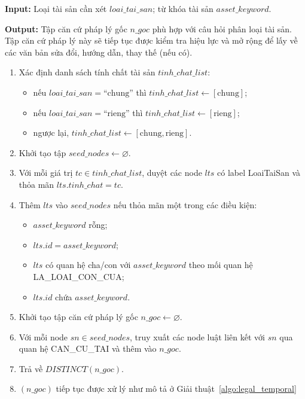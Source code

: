 \documentclass[../DoAn.tex]{subfiles}
\begin{document}
\begin{algorithm}[H]
\footnotesize
\textbf{Input:} Loại tài sản cần xét $loai\_tai\_san$; từ khóa tài sản $asset\_keyword$.

\textbf{Output:} Tập căn cứ pháp lý gốc $n\_goc$ phù hợp với câu hỏi phân loại tài sản. Tập căn cứ pháp lý này sẽ tiếp tục được kiểm tra hiệu lực và mở rộng để lấy về các văn bản sửa đổi, hướng dẫn, thay thế (nếu có).

\begin{enumerate}[label=\textbf{Bước \arabic*.}, leftmargin=1.6cm]
    \item Xác định danh sách tính chất tài sản $tinh\_chat\_list$:
    \begin{itemize}
        \item nếu $loai\_tai\_san = \text{``chung''}$ thì $tinh\_chat\_list \leftarrow [\text{chung}]$;
        \item nếu $loai\_tai\_san = \text{``rieng''}$ thì $tinh\_chat\_list \leftarrow [\text{rieng}]$;
        \item ngược lại, $tinh\_chat\_list \leftarrow [\text{chung}, \text{rieng}]$.
    \end{itemize}
    \item Khởi tạo tập $seed\_nodes \leftarrow \varnothing$.
    \item Với mỗi giá trị $tc \in tinh\_chat\_list$, duyệt các node $lts$ có label LoaiTaiSan và thỏa mãn $lts.tinh\_chat = tc$.
    \item Thêm $lts$ vào $seed\_nodes$ nếu thỏa mãn một trong các điều kiện:
    \begin{itemize}
        \item $asset\_keyword$ rỗng;
        \item $lts.id = asset\_keyword$;
        \item $lts$ có quan hệ cha/con với $asset\_keyword$ theo mối quan hệ LA\_LOAI\_CON\_CUA;
        \item $lts.id$ chứa $asset\_keyword$.
    \end{itemize}
    \item Khởi tạo tập căn cứ pháp lý gốc $n\_goc \leftarrow \varnothing$.
    \item Với mỗi node $sn \in seed\_nodes$, truy xuất các node luật liên kết với $sn$ qua quan hệ CAN\_CU\_TAI và thêm vào $n\_goc$.
    \item Trả về $DISTINCT(n\_goc)$.
    \item $(n\_goc)$ tiếp tục được xử lý như mô tả ở Giải thuật~\ref{algo:legal_temporal}
\end{enumerate}
\caption{Pseudocode câu Cypher query template cho dạng câu hỏi phân loại tài sản}
\label{alg:phan-loai-seed}
\end{algorithm}
\end{document}
